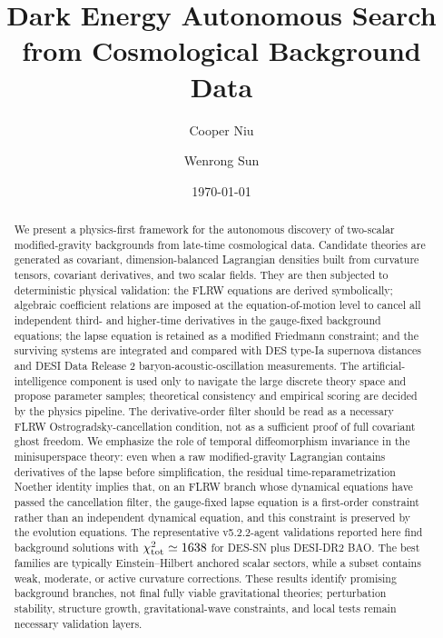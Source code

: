 \documentclass[aps,prd,twocolumn,superscriptaddress,nofootinbib,longbibliography]{revtex4-2}
\newcommand{\chiT}{\chi^2_{\rm tot}}
\begin{document}

\title{Dark Energy Autonomous Search from Cosmological Background Data}

\author{Cooper Niu}

\author{Wenrong Sun}

\date{\today}


\begin{abstract}
We present a physics-first framework for the autonomous discovery of two-scalar modified-gravity backgrounds from late-time cosmological data.  Candidate theories are generated as covariant, dimension-balanced Lagrangian densities built from curvature tensors, covariant derivatives, and two scalar fields.  They are then subjected to deterministic physical validation: the FLRW equations are derived symbolically; algebraic coefficient relations are imposed at the equation-of-motion level to cancel all independent third- and higher-time derivatives in the gauge-fixed background equations; the lapse equation is retained as a modified Friedmann constraint; and the surviving systems are integrated and compared with DES type-Ia supernova distances and DESI Data Release 2 baryon-acoustic-oscillation measurements.  The artificial-intelligence component is used only to navigate the large discrete theory space and propose parameter samples; theoretical consistency and empirical scoring are decided by the physics pipeline.  The derivative-order filter should be read as a necessary FLRW Ostrogradsky-cancellation condition, not as a sufficient proof of full covariant ghost freedom.  We emphasize the role of temporal diffeomorphism invariance in the minisuperspace theory: even when a raw modified-gravity Lagrangian contains derivatives of the lapse before simplification, the residual time-reparametrization Noether identity implies that, on an FLRW branch whose dynamical equations have passed the cancellation filter, the gauge-fixed lapse equation is a first-order constraint rather than an independent dynamical equation, and this constraint is preserved by the evolution equations.  The representative v5.2.2-agent validations reported here find background solutions with $\chiT\simeq 1638$ for DES-SN plus DESI-DR2 BAO.  The best families are typically Einstein--Hilbert anchored scalar sectors, while a subset contains weak, moderate, or active curvature corrections.  These results identify promising background branches, not final fully viable gravitational theories; perturbation stability, structure growth, gravitational-wave constraints, and local tests remain necessary validation layers.
\end{abstract}
\end{document}
